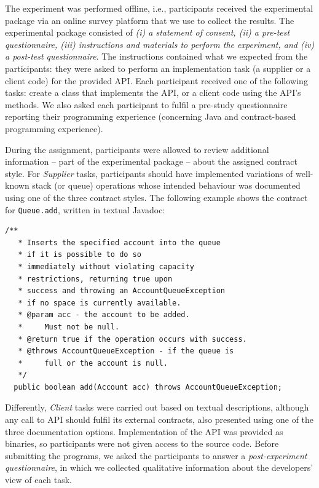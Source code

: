 The experiment was performed offline, i.e., participants received the experimental package via an online survey platform that we use to collect the results.
The experimental package consisted of \emph{(i) a statement of consent, (ii) a pre-test
questionnaire, (iii) instructions and materials to perform the experiment, and (iv) a post-test questionnaire}. 
The instructions contained what we expected from the participants: they were asked to perform an implementation task (a supplier or a client code) for the
provided API. Each participant received one of the following tasks: create a class that implements the API, or a client code using the API's methods.
We also asked each participant to fulfil a pre-study questionnaire reporting their programming experience (concerning Java and contract-based programming experience). 

During the assignment, participants were allowed to review additional information -- part of the experimental package -- about the assigned contract style. 
For \textit{Supplier} tasks, participants should have implemented variations of well-known stack (or queue) operations whose intended behaviour was documented using one of the three contract styles. The following example shows the contract for \lstinline!Queue.add!, written in textual Javadoc:

\begin{lstlisting}[basicstyle=\footnotesize\ttfamily,name=figxpi, frame=lines, mathescape=true]
/**
   * Inserts the specified account into the queue 
   * if it is possible to do so 
   * immediately without violating capacity 
   * restrictions, returning true upon 
   * success and throwing an AccountQueueException 
   * if no space is currently available.
   * @param acc - the account to be added. 
   *     Must not be null.
   * @return true if the operation occurs with success.
   * @throws AccountQueueException - if the queue is 
   *     full or the account is null.
   */
  public boolean add(Account acc) throws AccountQueueException;
\end{lstlisting}

Differently, \textit{Client} tasks were carried out based on textual descriptions, although any call to API should fulfil its external contracts, also presented using one of the three documentation options. Implementation of the API was provided as binaries, so participants were not given access to the source code.
Before submitting the programs, we asked the participants to answer a \emph{post-experiment questionnaire}, in which we collected qualitative information about the developers' view of each task.

